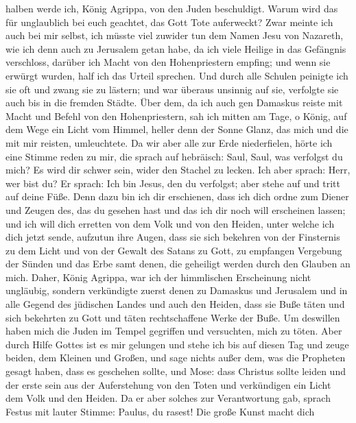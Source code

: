 halben werde ich, König Agrippa, von den Juden beschuldigt. 
Warum wird das für unglaublich bei euch geachtet, das Gott Tote
auferweckt?  Zwar meinte ich auch bei mir selbst, ich müsste
viel zuwider tun dem Namen Jesu von Nazareth,  wie ich denn
auch zu Jerusalem getan habe, da ich viele Heilige in das Gefängnis
verschloss, darüber ich Macht von den Hohenpriestern empfing; und wenn
sie erwürgt wurden, half ich das Urteil sprechen.  Und
durch alle Schulen peinigte ich sie oft und zwang sie zu lästern; und
war überaus unsinnig auf sie, verfolgte sie auch bis in die fremden
Städte.  Über dem, da ich auch gen Damaskus reiste mit
Macht und Befehl von den Hohenpriestern,  sah ich mitten am
Tage, o König, auf dem Wege ein Licht vom Himmel, heller denn der Sonne
Glanz, das mich und die mit mir reisten, umleuchtete.  Da
wir aber alle zur Erde niederfielen, hörte ich eine Stimme reden zu mir,
die sprach auf hebräisch: Saul, Saul, was verfolgst du mich? Es wird dir
schwer sein, wider den Stachel zu lecken.  Ich aber sprach:
Herr, wer bist du? Er sprach: Ich bin Jesus, den du verfolgst; aber
stehe auf und tritt auf deine Füße.  Denn dazu bin ich dir
erschienen, dass ich dich ordne zum Diener und Zeugen des, das du
gesehen hast und das ich dir noch will erscheinen lassen; 
und ich will dich erretten von dem Volk und von den Heiden, unter welche
ich dich jetzt sende,  aufzutun ihre Augen, dass sie sich
bekehren von der Finsternis zu dem Licht und von der Gewalt des Satans
zu Gott, zu empfangen Vergebung der Sünden und das Erbe samt denen, die
geheiligt werden durch den Glauben an mich.  Daher, König
Agrippa, war ich der himmlischen Erscheinung nicht ungläubig,
 sondern verkündigte zuerst denen zu Damaskus und Jerusalem
und in alle Gegend des jüdischen Landes und auch den Heiden, dass sie
Buße täten und sich bekehrten zu Gott und täten rechtschaffene Werke der
Buße.  Um deswillen haben mich die Juden im Tempel
gegriffen und versuchten, mich zu töten.  Aber durch Hilfe
Gottes ist es mir gelungen und stehe ich bis auf diesen Tag und zeuge
beiden, dem Kleinen und Großen, und sage nichts außer dem, was die
Propheten gesagt haben, dass es geschehen sollte, und Mose:
 dass Christus sollte leiden und der erste sein aus der
Auferstehung von den Toten und verkündigen ein Licht dem Volk und den
Heiden.  Da er aber solches zur Verantwortung gab, sprach
Festus mit lauter Stimme: Paulus, du rasest! Die große Kunst macht dich
